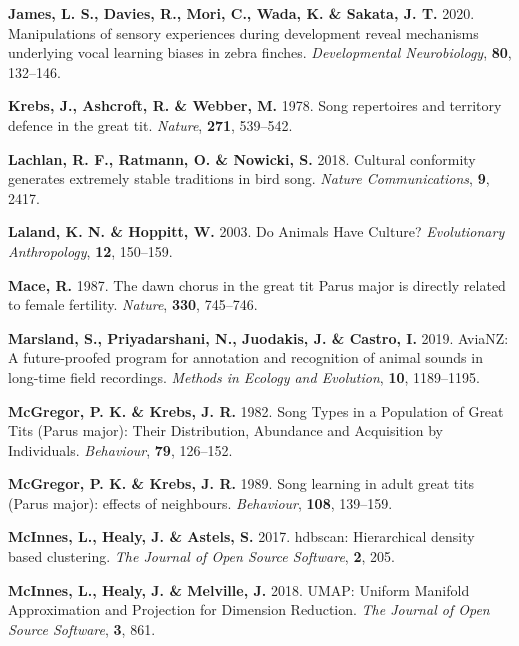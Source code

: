 \documentclass[]{report}
\begin{document}
\leavevmode\hypertarget{ref-James2020}{}%
\textbf{James, L. S., Davies, R., Mori, C., Wada, K. \& Sakata, J. T.}
2020. Manipulations of sensory experiences during development reveal
mechanisms underlying vocal learning biases in zebra finches.
\emph{Developmental Neurobiology}, \textbf{80}, 132--146.

\leavevmode\hypertarget{ref-Krebs1978}{}%
\textbf{Krebs, J., Ashcroft, R. \& Webber, M.} 1978. Song repertoires
and territory defence in the great tit. \emph{Nature}, \textbf{271},
539--542.

\leavevmode\hypertarget{ref-Lachlan2018b}{}%
\textbf{Lachlan, R. F., Ratmann, O. \& Nowicki, S.} 2018. Cultural
conformity generates extremely stable traditions in bird song.
\emph{Nature Communications}, \textbf{9}, 2417.

\leavevmode\hypertarget{ref-Laland2003}{}%
\textbf{Laland, K. N. \& Hoppitt, W.} 2003. Do Animals Have Culture?
\emph{Evolutionary Anthropology}, \textbf{12}, 150--159.

\leavevmode\hypertarget{ref-Mace1987}{}%
\textbf{Mace, R.} 1987. The dawn chorus in the great tit Parus major is
directly related to female fertility. \emph{Nature}, \textbf{330},
745--746.

\leavevmode\hypertarget{ref-Marsland2019}{}%
\textbf{Marsland, S., Priyadarshani, N., Juodakis, J. \& Castro, I.}
2019. AviaNZ: A future-proofed program for annotation and recognition of
animal sounds in long-time field recordings. \emph{Methods in Ecology
and Evolution}, \textbf{10}, 1189--1195.

\leavevmode\hypertarget{ref-McGregor1982}{}%
\textbf{McGregor, P. K. \& Krebs, J. R.} 1982. Song Types in a
Population of Great Tits (Parus major): Their Distribution, Abundance
and Acquisition by Individuals. \emph{Behaviour}, \textbf{79}, 126--152.

\leavevmode\hypertarget{ref-McGregor1989}{}%
\textbf{McGregor, P. K. \& Krebs, J. R.} 1989. Song learning in adult
great tits (Parus major): effects of neighbours. \emph{Behaviour},
\textbf{108}, 139--159.

\leavevmode\hypertarget{ref-McInnes2017}{}%
\textbf{McInnes, L., Healy, J. \& Astels, S.} 2017. hdbscan:
Hierarchical density based clustering. \emph{The Journal of Open Source
Software}, \textbf{2}, 205.

\leavevmode\hypertarget{ref-McInnes2018}{}%
\textbf{McInnes, L., Healy, J. \& Melville, J.} 2018. UMAP: Uniform
Manifold Approximation and Projection for Dimension Reduction. \emph{The
Journal of Open Source Software}, \textbf{3}, 861.
\end{document}
